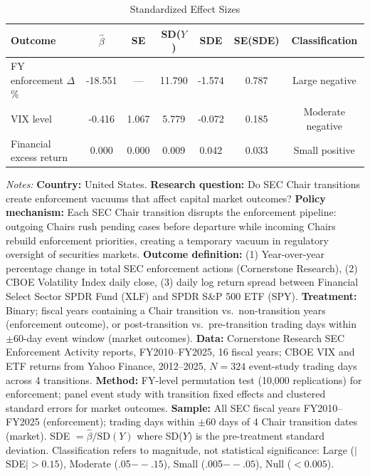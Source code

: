 \begin{table}[t]
\centering
\caption{Standardized Effect Sizes}
\label{tab:sde}
\small
\begin{tabular}{lcccccc}
\toprule
Outcome & $\hat{\beta}$ & SE & SD($Y$) & SDE & SE(SDE) & Classification \\
\midrule
FY enforcement $\Delta$\% & -18.551 & --- & 11.790 & -1.574 & 0.787 & Large negative \\
VIX level & -0.416 & 1.067 & 5.779 & -0.072 & 0.185 & Moderate negative \\
Financial excess return & 0.000 & 0.000 & 0.009 & 0.042 & 0.033 & Small positive \\
\bottomrule
\end{tabular}
\begin{tablenotes}
\item \textit{Notes:} \textbf{Country:} United States. \textbf{Research question:} Do SEC Chair transitions create enforcement vacuums that affect capital market outcomes? \textbf{Policy mechanism:} Each SEC Chair transition disrupts the enforcement pipeline: outgoing Chairs rush pending cases before departure while incoming Chairs rebuild enforcement priorities, creating a temporary vacuum in regulatory oversight of securities markets. \textbf{Outcome definition:} (1) Year-over-year percentage change in total SEC enforcement actions (Cornerstone Research), (2) CBOE Volatility Index daily close, (3) daily log return spread between Financial Select Sector SPDR Fund (XLF) and SPDR S\&P 500 ETF (SPY). \textbf{Treatment:} Binary; fiscal years containing a Chair transition vs.\ non-transition years (enforcement outcome), or post-transition vs.\ pre-transition trading days within $\pm$60-day event window (market outcomes). \textbf{Data:} Cornerstone Research SEC Enforcement Activity reports, FY2010--FY2025, 16 fiscal years; CBOE VIX and ETF returns from Yahoo Finance, 2012--2025, $N = 324$ event-study trading days across 4 transitions. \textbf{Method:} FY-level permutation test (10,000 replications) for enforcement; panel event study with transition fixed effects and clustered standard errors for market outcomes. \textbf{Sample:} All SEC fiscal years FY2010--FY2025 (enforcement); trading days within $\pm$60 days of 4 Chair transition dates (market). SDE $= \hat{\beta} / \text{SD}(Y)$ where SD($Y$) is the pre-treatment standard deviation. Classification refers to magnitude, not statistical significance: Large ($|$SDE$| > 0.15$), Moderate (.05$--.15$), Small (.005$--.05$), Null ($< 0.005$).
\end{tablenotes}
\end{table}

